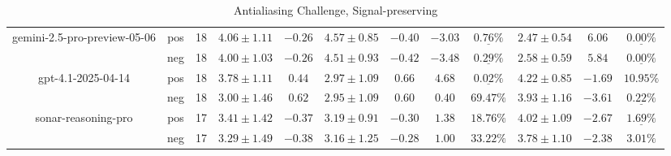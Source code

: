\begin{table}[ht!]
{\begin{tabular}{| c || c | c || c | c || c | c | c | c || c | c | c ||}
      gemini-2.5-pro-preview-05-06
        & pos
        & 18
        & $4.06 \pm 1.11$
        & $-0.26$
        & $4.57 \pm 0.85$
        & $-0.40$
        & $-3.03$
        & $\underline{\mathbf{0.76\%}}$
        & $2.47 \pm 0.54$
        & $6.06$
        & $\underline{\mathbf{0.00\%}}$ \\
        & neg
        & 18
        & $4.00 \pm 1.03$
        & $-0.26$
        & $4.51 \pm 0.93$
        & $-0.42$
        & $-3.48$
        & $\underline{\mathbf{0.29\%}}$
        & $2.58 \pm 0.59$
        & $5.84$
        & $\underline{\mathbf{0.00\%}}$ \\
    \hline


      gpt-4.1-2025-04-14
        & pos
        & 18
        & $3.78 \pm 1.11$
        & $0.44$
        & $2.97 \pm 1.09$
        & $0.66$
        & $4.68$
        & $\underline{\mathbf{0.02\%}}$
        & $4.22 \pm 0.85$
        & $-1.69$
        & $10.95\text{\%}$ \\
        & neg
        & 18
        & $3.00 \pm 1.46$
        & $0.62$
        & $2.95 \pm 1.09$
        & $0.60$
        & $0.40$
        & $69.47\text{\%}$
        & $3.93 \pm 1.16$
        & $-3.61$
        & $\underline{\mathbf{0.22\%}}$ \\
    \hline


      sonar-reasoning-pro
        & pos
        & 17
        & $3.41 \pm 1.42$
        & $-0.37$
        & $3.19 \pm 0.91$
        & $-0.30$
        & $1.38$
        & $18.76\text{\%}$
        & $4.02 \pm 1.09$
        & $-2.67$
        & $\underline{\mathbf{1.69\%}}$ \\
        & neg
        & 17
        & $3.29 \pm 1.49$
        & $-0.38$
        & $3.16 \pm 1.25$
        & $-0.28$
        & $1.00$
        & $33.22\text{\%}$
        & $3.78 \pm 1.10$
        & $-2.38$
        & $3.01\text{\%}$ \\
    \hline


      \hline
    \end{tabular}
  }
  \caption{Antialiasing Challenge, Signal-preserving}
  \label{tbleval-distortion-signal_score}
\end{table}


